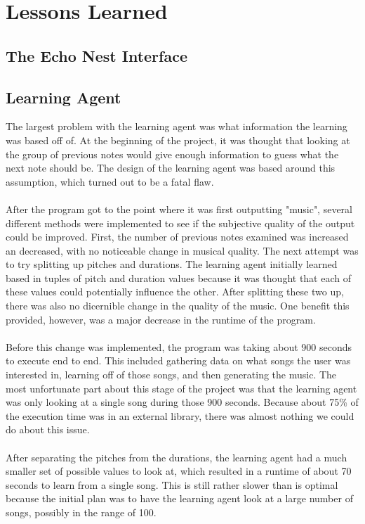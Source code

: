 \documentclass{article}
\begin{document}
\section{Lessons Learned}
\subsection{The Echo Nest Interface}

\subsection{Learning Agent}
The largest problem with the learning agent was what information the learning was based off of. At the beginning of the project, it was thought that looking at the group of previous notes would give enough information to guess what the next note should be. The design of the learning agent was based around this assumption, which turned out to be a fatal flaw.\\
\\
After the program got to the point where it was first outputting "music", several different methods were implemented to see if the subjective quality of the output could be improved. First, the number of previous notes examined was increased an decreased, with no noticeable change in musical quality. The next attempt was to try splitting up pitches and durations. The learning agent initially learned based in tuples of pitch and duration values because it was thought that each of these values could potentially influence the other. After splitting these two up, there was also no dicernible change in the quality of the music. One benefit this provided, however, was a major decrease in the runtime of the program.\\
\\
Before this change was implemented, the program was taking about 900 seconds to execute end to end. This included gathering data on what songs the user was interested in, learning off of those songs, and then generating the music. The most unfortunate part about this stage of the project was that the learning agent was only looking at a single song during those 900 seconds. Because about 75\% of the execution time was in an external library, there was almost nothing we could do about this issue.\\
\\
After separating the pitches from the durations, the learning agent had a much smaller set of possible values to look at, which resulted in a runtime of about 70 seconds to learn from a single song. This is still rather slower than is optimal because the initial plan was to have the learning agent look at a large number of songs, possibly in the range of 100.\\
\end{document}
